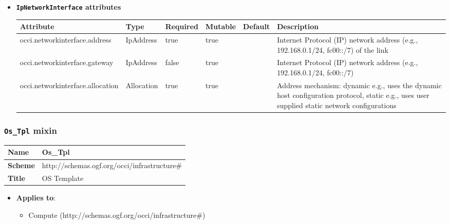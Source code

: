 \begin{itemize}
\item \textbf{\texttt{IpNetworkInterface} attributes}

\begin{tabularx}{\textwidth}{|l|l|p{1.4cm}|p{1.3cm}|l|X|}
  \hline
  \textbf{Attribute} & \textbf{Type} & \textbf{Required} & \textbf{Mutable} & \textbf{Default} & \textbf{Description} \\
  \hline  
  occi.networkinterface.address & IpAddress & true & true &  & Internet Protocol (IP) network address (e.g., 192.168.0.1/24, fc00::/7) of the link \\
  \hline
  occi.networkinterface.gateway & IpAddress & false & true &  & Internet Protocol (IP) network address (e.g., 192.168.0.1/24, fc00::/7) \\
  \hline
  occi.networkinterface.allocation & Allocation & true & true &  & Address mechanism: dynamic e.g., uses the dynamic host configuration protocol, static e.g., uses user supplied static network configurations \\
  \hline
\end{tabularx}
\end{itemize}


 
\subsubsection{\texttt{Os\_Tpl} mixin}
\begin{center}
\begin{tabular}{|l|l|}
  \hline
  \textbf{Name} & Os\_Tpl \\
  \hline  
  \textbf{Scheme} & http://schemas.ogf.org/occi/infrastructure\# \\
  \hline
  \textbf{Title} & OS Template \\
  \hline
\end{tabular}
\end{center}
\begin{itemize}
\item \textbf{Applies to}:
\begin{itemize}
	\item Compute (http://schemas.ogf.org/occi/infrastructure\#)
\end{itemize}
\end{itemize} 



 
